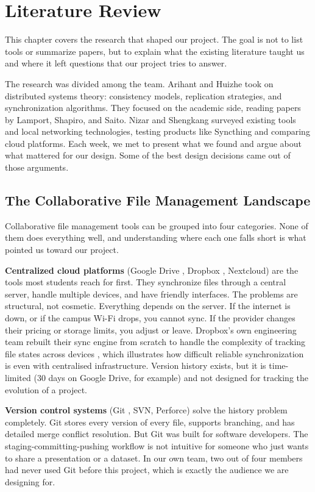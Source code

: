 \chapter{Literature Review}

This chapter covers the research that shaped our project. The goal is not to list tools or summarize papers, but to explain what the existing literature taught us and where it left questions that our project tries to answer.

The research was divided among the team. Arihant and Huizhe took on distributed systems theory: consistency models, replication strategies, and synchronization algorithms. They focused on the academic side, reading papers by Lamport, Shapiro, and Saito. Nizar and Shengkang surveyed existing tools and local networking technologies, testing products like Syncthing and comparing cloud platforms. Each week, we met to present what we found and argue about what mattered for our design. Some of the best design decisions came out of those arguments.

\section{The Collaborative File Management Landscape}

Collaborative file management tools can be grouped into four categories. None of them does everything well, and understanding where each one falls short is what pointed us toward our project.

\textbf{Centralized cloud platforms} (Google Drive \cite{googledrive}, Dropbox \cite{dropbox}, Nextcloud) are the tools most students reach for first. They synchronize files through a central server, handle multiple devices, and have friendly interfaces. The problems are structural, not cosmetic. Everything depends on the server. If the internet is down, or if the campus Wi-Fi drops, you cannot sync. If the provider changes their pricing or storage limits, you adjust or leave. Dropbox's own engineering team rebuilt their sync engine from scratch to handle the complexity of tracking file states across devices \cite{dropboxtech}, which illustrates how difficult reliable synchronization is even with centralised infrastructure. Version history exists, but it is time-limited (30 days on Google Drive, for example) and not designed for tracking the evolution of a project.

\textbf{Version control systems} (Git \cite{gitbook}, SVN, Perforce) solve the history problem completely. Git stores every version of every file, supports branching, and has detailed merge conflict resolution. But Git was built for software developers. The staging-committing-pushing workflow is not intuitive for someone who just wants to share a presentation or a dataset. In our own team, two out of four members had never used Git before this project, which is exactly the audience we are designing for.

